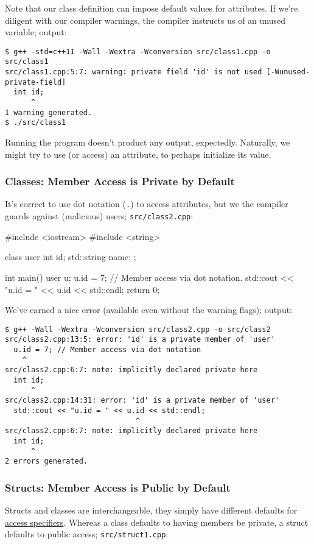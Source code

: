 \documentclass[12pt,letterpaper,twoside]{article}
\begin{document}
Note that our class definition can impose default values for attributes.
If we're diligent with our compiler warnings, the compiler instructs us of 
an unused variable; output:

\begin{verbatim}
$ g++ -std=c++11 -Wall -Wextra -Wconversion src/class1.cpp -o src/class1
src/class1.cpp:5:7: warning: private field 'id' is not used [-Wunused-private-field]
  int id;
      ^
1 warning generated.
$ ./src/class1
\end{verbatim}

Running the program doesn't product any output, expectedly. Naturally, 
we might try to use (or access) an attribute, to perhaps initialize its value.

\subsubsection{Classes: Member Access is Private by Default}
It's correct to use dot notation (\texttt{.}) to access attributes, but we 
the compiler guards against (malicious) users;
\texttt{src/class2.cpp}:

\begin{cpp}
#include <iostream>
#include <string>

class user {
  int id;
  std::string name;
};

int main() {
  user u;
  u.id = 7; // Member access via dot notation.
  std::cout << "u.id = " << u.id << std::endl;
  return 0;
}
\end{cpp}

We've earned a nice error (available even without the warning flags);
output:

\begin{verbatim}
$ g++ -Wall -Wextra -Wconversion src/class2.cpp -o src/class2
src/class2.cpp:13:5: error: 'id' is a private member of 'user'
  u.id = 7; // Member access via dot notation
    ^
src/class2.cpp:6:7: note: implicitly declared private here
  int id;
      ^
src/class2.cpp:14:31: error: 'id' is a private member of 'user'
  std::cout << "u.id = " << u.id << std::endl;
                              ^
src/class2.cpp:6:7: note: implicitly declared private here
  int id;
      ^
2 errors generated.
\end{verbatim}

\subsubsection{Structs: Member Access is Public by Default} Structs and
classes are interchangeable, they simply have different defaults for
\href{https://en.cppreference.com/w/cpp/language/access}{access specifiers}. 
Whereas a 
class defaults to having members be private, a struct defaults to public access;
\texttt{src/struct1.cpp}:
\end{document}
